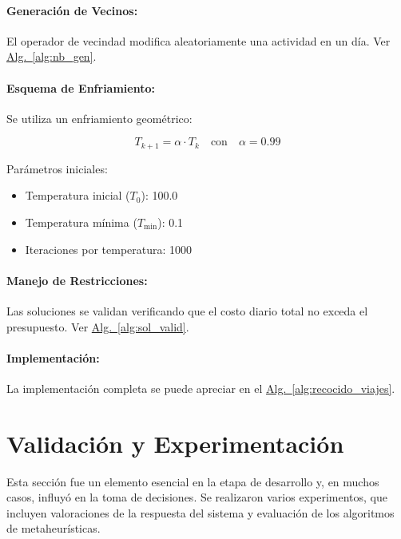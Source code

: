 \documentclass[10pt]{llncs}
\newcommand{\AlgRef}[1]{\hyperref[#1]{Alg.~\ref{#1}}}
\begin{document}
\paragraph{Generación de Vecinos:}
El operador de vecindad modifica aleatoriamente una actividad en un día. Ver \AlgRef{alg:nb_gen}.

\paragraph{Esquema de Enfriamiento:}
Se utiliza un enfriamiento geométrico:

\[
T_{k+1} = \alpha \cdot T_k \quad \text{con} \quad \alpha = 0.99
\]

Parámetros iniciales:
\begin{itemize}
    \item Temperatura inicial ($T_0$): 100.0
    \item Temperatura mínima ($T_{\min}$): 0.1
    \item Iteraciones por temperatura: 1000
\end{itemize}

\paragraph{Manejo de Restricciones:}
Las soluciones se validan verificando que el costo diario total no exceda el presupuesto. Ver \AlgRef{alg:sol_valid}.

\paragraph{Implementación:}
La implementación completa se puede apreciar en el \AlgRef{alg:recocido_viajes}.


\vspace{\baselineskip}
\section{Validación y Experimentación}


\vspace{\baselineskip}



Esta sección fue un elemento esencial en la etapa de desarrollo y, en muchos casos, influyó en la toma de decisiones. Se realizaron varios experimentos, que incluyen valoraciones de la respuesta del sistema y evaluación de los algoritmos de metaheurísticas.

\vspace{\baselineskip}
\end{document}
